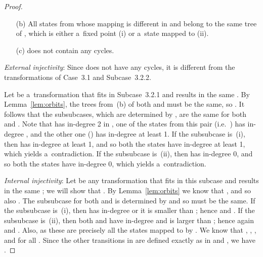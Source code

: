 \documentclass{amsart}
\begin{document}
\begin{proof}
\begin{enumerate}
\item[(b)] All states from  whose mapping is different in  and  belong to the same tree of ,
which is either a~fixed point (i) or a~state mapped to  (ii).

\item[(c)]  does not contain any cycles.
\end{enumerate}

\textit{External injectivity}:
Since  does not have any cycles, it is different from the transformations of Case~3.1 and Subcase~3.2.2.

Let  be a~transformation that fits in Subcase~3.2.1 and results in the same .
By Lemma~\ref{lem:orbits}, the trees from~(b) of both  and  must be the same, so .
It follows that the subsubcases, which are determined by , are the same for both  and .
Note that  has in-degree 2 in , one of the states from this pair (i.e.\ ) has in-degree , and the other one () has in-degree at least 1.
If the subsubcase is~(i), then  has in-degree at least 1, and so both the states have in-degree at least 1, which yields a~contradiction.
If the subsubcase is~(ii), then  has in-degree 0, and so both the states have in-degree 0, which yields a~contradiction.

\textit{Internal injectivity}:
Let  be any transformation that fits in this subcase and results in the same ; we will show that .
By Lemma~\ref{lem:orbits} we know that , and so also .
The subsubcase for both  and  is determined by  and so must be the same.
If the subsubcase is~(i), then  has in-degree  or it is smaller than ; hence  and .
If the subsubcase is~(ii), then both  and  have in-degree  and  is larger than ; hence again  and .
Also,  as these are precisely all the states mapped to  by .
We know that , , , and  for all .
Since the other transitions in  are defined exactly as in  and , we have .


\end{proof}
\end{document}

